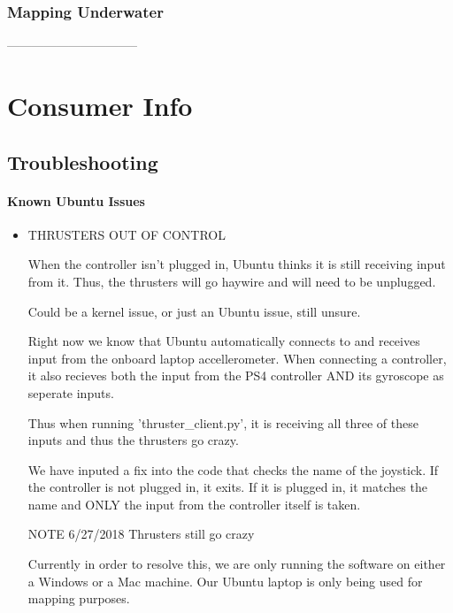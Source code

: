 \documentclass[
18pt, %
a4paper, %
oneside, %
headinclude,footinclude, %
]{scrartcl}
\begin{document}
\subsubsection{Mapping Underwater}



--------------------------------

\section{Consumer Info}

\subsection{Troubleshooting}

\paragraph{Known Ubuntu Issues}
\begin{itemize}
	\item THRUSTERS OUT OF CONTROL
	
	When the controller isn't plugged in, Ubuntu thinks it is still receiving input from it. Thus, the thrusters will go haywire and will need to be unplugged. 
	
	Could be a kernel issue, or just an Ubuntu issue, still unsure.
	
	Right now we know that Ubuntu automatically connects to and receives input from the onboard laptop accellerometer. When connecting a controller, it also recieves both the input from the PS4 controller AND its gyroscope as seperate inputs. 
	
	Thus when running 'thruster\_client.py', it is receiving all three of these inputs and thus the thrusters go crazy.
	
	We have inputed a fix into the code that checks the name of the joystick. If the controller is not plugged in, it exits. If it is plugged in, it matches the name and ONLY the input from the controller itself is taken.
	
	NOTE 6/27/2018 Thrusters still go crazy
	
	Currently in order to resolve this, we are only running the software on either a Windows or a Mac machine. Our Ubuntu laptop is only being used for mapping purposes.
	
\end{itemize}
\end{document}
